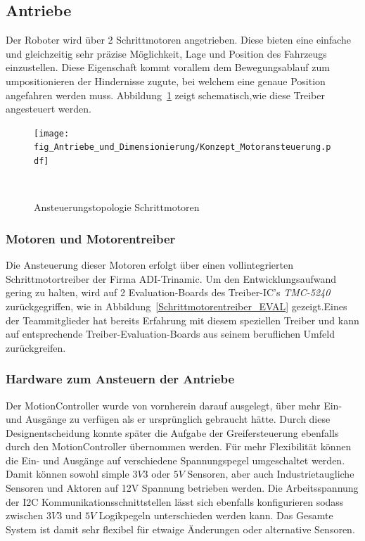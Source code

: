 \documentclass[main.tex]{subfiles} %
\begin{document}

\subsection{Antriebe}

Der Roboter wird über 2 Schrittmotoren angetrieben. Diese bieten eine einfache
und gleichzeitig sehr präzise Möglichkeit, Lage und Position des Fahrzeugs
einzustellen. Diese Eigenschaft kommt vorallem dem Bewegungsablauf zum
umpositionieren der Hindernisse zugute, bei welchem eine genaue Position
angefahren werden muss.
Abbildung~\ref{Ansteuerungstopologie_Schrittmotorentreiber} zeigt
schematisch,wie diese Treiber angesteuert werden.

\begin{figure}[H]
    \centering
    \texttt{[image: fig\_Antriebe\_und\_Dimensionierung/Konzept\_Motoransteuerung.pdf]}
    \caption{Ansteuerungstopologie Schrittmotoren}~\label{Ansteuerungstopologie_Schrittmotorentreiber}
\end{figure}


\subsubsection*{Motoren und Motorentreiber}

Die Ansteuerung dieser Motoren erfolgt über einen vollintegrierten
Schrittmotortreiber der Firma ADI-Trinamic. Um den Entwicklungsaufwand gering
zu halten, wird auf 2 Evaluation-Boards des Treiber-IC's \textit{TMC-5240}
zurückgegriffen, wie in Abbildung~\ref{Schrittmotorentreiber_EVAL}
gezeigt.Eines der Teammitglieder hat bereits Erfahrung mit diesem speziellen
Treiber und kann auf entsprechende Treiber-Evaluation-Boards aus seinem
beruflichen Umfeld zurückgreifen.

\subsubsection{Hardware zum Ansteuern der Antriebe}

Der MotionController wurde von vornherein darauf ausgelegt, über mehr Ein- und
Ausgänge zu verfügen als er ursprünglich gebraucht hätte. Durch diese
Designentscheidung konnte später die Aufgabe der Greifersteuerung ebenfalls
durch den MotionController übernommen werden. Für mehr Flexibilität können die
Ein- und Ausgänge auf verschiedene Spannungspegel umgeschaltet werden. Damit
können sowohl simple $3V3$ oder $5V$ Sensoren, aber auch Industrietaugliche
Sensoren und Aktoren auf 12V Spannung betrieben werden. Die Arbeitsspannung der
I2C Kommunikationsschnittstellen lässt sich ebenfalls konfigurieren sodass
zwischen $3V3$ und $5V$ Logikpegeln unterschieden werden kann. Das Gesamte
System ist damit sehr flexibel für etwaige Änderungen oder alternative
Sensoren.
\end{document}
